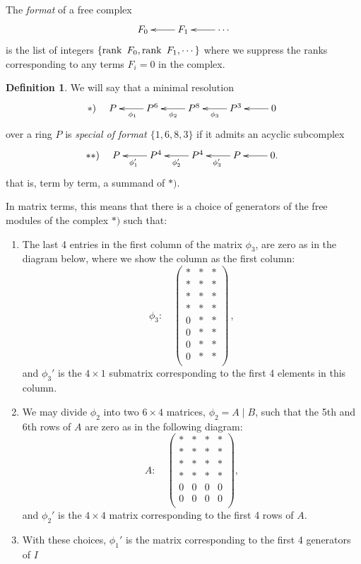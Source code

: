 \documentclass[twoside,12pt, leqno]{amsart}
\DeclareMathOperator{\rank}{{\rm rank}}
\theoremstyle{definition}
\newtheorem{definition}[theorem]{Definition}
\begin{document}
 The \emph{format} of a free complex
$$
\xymatrix{
F_{0}&\ar[l]F_{1}&\ar[l]  \cdots
}$$
is the list of integers $\{\rank\ F_{0}, \rank\ F_{1}, \cdots\}$ where
we suppress the ranks corresponding to any terms $F_{i} = 0$ in the 
complex. 

\begin{definition}\label{special format}
We will say that a minimal resolution 
$$
 *)\quad 
 \xymatrix{P &\ar[l]^{\phi_{1}} P^{6}& \ar[l]^{\phi_{2}}  P^{8}&\ar[l]^{\phi_{3}} P^{3}&\ar[l] 0}
 $$
 over a ring $P$
is \emph{special of format $\{1,6,8,3\}$} if it admits an acyclic subcomplex
$$
  **) 
 \xymatrix{\quad P&\ar[l]^{\phi_{1}'} P^{4} &\ar[l]^{\phi_{2}'}  P^{4}&\ar[l]^{\phi_{3}'} P &\ar[l] 0.}
  $$
 that is, term by term, a summand of $*)$. 
  
 In matrix terms, this means that 
there is
 a choice of generators of the free modules of the complex $*)$ such that:

 
\begin{enumerate} 

\item  The last 4 entries in 
 the first column of the matrix $\phi_{3}$, are zero as in the diagram below, where we show the column as the first column:
 $$
 \phi_{3}:\quad 
\begin{pmatrix}
*&*&*\\
*&*&*\\
*&*&*\\
*&*&*\\
0&*&*\\
0&*&*\\
0&*&*\\
0&*&*\\
\end{pmatrix}\, ,
$$
and $\phi_{3}'$ is the $4\times 1$ submatrix corresponding
to the first 4 elements in this column.
 
 \item We may divide $\phi_{2}$ into two $6\times 4$
matrices, $\phi_{2} = A\mid B$, such that
 the 5th and 6th rows of $A$ are zero as in the following diagram:
 $$
A: \quad
\begin{pmatrix}
 *&*&*&*\\
*&*&*&*\\
*&*&*&*\\
*&*&*&*\\
0&0&0&0\\
0&0&0&0\\
\end{pmatrix},
$$
and $\phi_{2}'$ is the $4\times 4$ matrix corresponding
  to the first 4 rows of $A$.
  
  \item With these choices, $\phi_{1}'$ is the matrix
  corresponding to the first 4 generators of $I$
  \end{enumerate}

  \end{definition}
\end{document}
